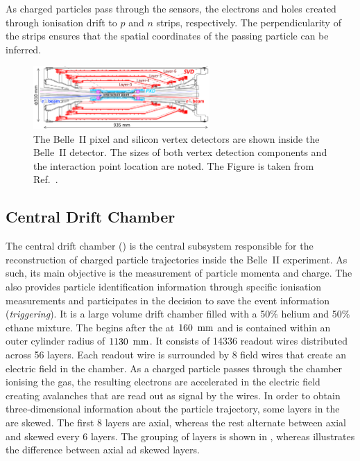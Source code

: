 As charged particles pass through the \SVD sensors, the electrons and holes created through ionisation drift to $p$ and $n$ strips, respectively.
The perpendicularity of the strips ensures that the spatial coordinates of the passing particle can be inferred.

\begin{figure}[hbtp!]
    \centering
    \includegraphics[width=0.6\textwidth]{figures/experimental_setup/vxd.png}
    \caption{\label{fig:vxd}
    The Belle~II pixel and silicon vertex detectors are shown inside the Belle~II detector.
    The sizes of both vertex detection components and the interaction point location are noted.
    The Figure is taken from Ref.~\cite{Belle-IISVD:2023mxk}.
    }
\end{figure}

\subsection{Central Drift Chamber}\label{sec:cdc}

The central drift chamber (\CDC) \cite{Taniguchi:2017not} is the central subsystem responsible for the reconstruction of charged particle trajectories inside the Belle~II experiment.
As such, its main objective is the measurement of particle momenta and charge.
The \CDC also provides particle identification information through specific ionisation measurements
and participates in the decision to save the event information (\textit{triggering}).
It is a large volume drift chamber filled with a 50\% helium and 50\% ethane mixture.
The \CDC begins after the \SVD at $160~{\rm \,mm}$ and is contained within an outer cylinder radius of $1130~{\rm \,mm}$.
It consists of 14336 readout wires distributed across 56 layers.
Each readout wire is surrounded by 8 field wires that create an electric field in the chamber.
As a charged particle passes through the chamber ionising the gas,
the resulting electrons are accelerated in the electric field creating avalanches that are read out as signal by the wires.
In order to obtain three-dimensional information about the particle trajectory,
some layers in the \CDC are skewed.
The first 8 layers are axial, whereas the rest alternate between axial and skewed every 6 layers.
The grouping of layers is shown in , whereas  illustrates the difference between axial ad skewed layers.

